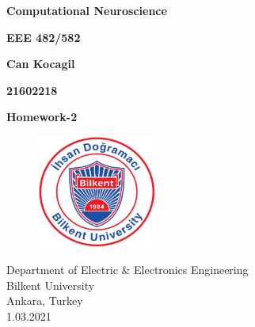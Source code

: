 \documentclass[12pt]{amsart}
\begin{document}
\begin{titlepage}
   \begin{center}
       \vspace*{1cm}

       \textbf{Computational Neuroscience}

       \vspace{0.7cm}
        \textbf{EEE 482/582}
            
       \vspace{0.7cm}

       \textbf{Can Kocagil} 
       
       \vspace{0.7cm}
       \textbf{21602218}

       \vspace{0.7cm}
            
       \textbf{Homework-2}
            
       \vspace{0.8cm}
         \begin{figure}[h]
            \centering
            \includegraphics[width = 0.35\textwidth]{images/bilkent_logo.png}
        \end{figure}
       \vspace{0.7cm}  
       Department of Electric \& Electronics Engineering \\
       \vspace{0.7cm}
       Bilkent University\\
       \vspace{0.7cm}
       Ankara, Turkey \\
       \vspace{0.7cm}
       1.03.2021
            
   \end{center}
\end{titlepage}

\tableofcontents
\newpage
\listoffigures
\end{document}
